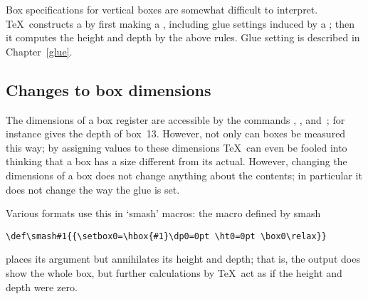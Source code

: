 \documentclass{book}
\begin{document}
Box specifications for  vertical boxes are
somewhat difficult to interpret. \TeX\ constructs a 
by first making a , including
glue settings induced by a ;
then it computes the height and depth by the above rules.
Glue setting is described in Chapter~\ref{glue}.

\subsection{Changes to box dimensions}

The dimensions of a box register are accessible by the
commands , , and~;
for instance  gives the depth of box~13.
However, not only can boxes be measured this way;
by assigning values to these
dimensions \TeX\ can even be fooled into thinking that
a box has a  size different from its actual.
However, changing the dimensions of a box does not change
anything about the contents; in particular it does not
change the way the glue is set.


Various formats use this in `smash' macros: the macro defined by
\cstoidx smash\par
\begin{verbatim}
\def\smash#1{{\setbox0=\hbox{#1}\dp0=0pt \ht0=0pt \box0\relax}}
\end{verbatim}
places its argument but annihilates its height and depth;
\altt
that is, the output does show the whole box, but further calculations
by \TeX\ act as if the height and depth were zero.
\end{document}

